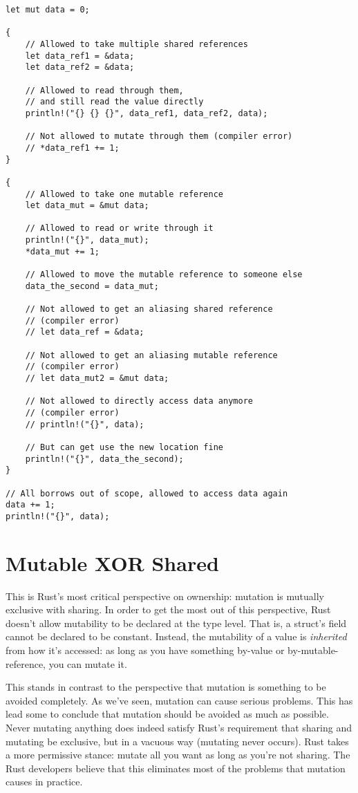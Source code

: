 \begin{verbatim}
let mut data = 0;

{
    // Allowed to take multiple shared references
    let data_ref1 = &data;
    let data_ref2 = &data;

    // Allowed to read through them,
    // and still read the value directly
    println!("{} {} {}", data_ref1, data_ref2, data);

    // Not allowed to mutate through them (compiler error)
    // *data_ref1 += 1;
}

{
    // Allowed to take one mutable reference
    let data_mut = &mut data;

    // Allowed to read or write through it
    println!("{}", data_mut);
    *data_mut += 1;

    // Allowed to move the mutable reference to someone else
    data_the_second = data_mut;

    // Not allowed to get an aliasing shared reference
    // (compiler error)
    // let data_ref = &data;

    // Not allowed to get an aliasing mutable reference
    // (compiler error)
    // let data_mut2 = &mut data;

    // Not allowed to directly access data anymore
    // (compiler error)
    // println!("{}", data);

    // But can get use the new location fine
    println!("{}", data_the_second);
}

// All borrows out of scope, allowed to access data again
data += 1;
println!("{}", data);
\end{verbatim}



\section{Mutable XOR Shared}

This is Rust's most critical perspective on ownership: mutation is mutually
exclusive with sharing. In order to get the most out of this perspective, Rust
doesn't allow mutability to be declared at the type level. That is, a struct's
field cannot be declared to be constant. Instead, the mutability of a value is
\emph{inherited} from how it's accessed: as long as you have something by-value or
by-mutable-reference, you can mutate it.

This stands in contrast to the perspective that mutation is something to be
avoided completely. As we've seen, mutation can cause serious problems. This
has lead some to conclude that mutation should be avoided as much
as possible. Never mutating anything does indeed satisfy Rust's requirement
that sharing and mutating be exclusive, but in a vacuous way (mutating never
occurs). Rust takes a more permissive stance: mutate all you want as long
as you're not sharing. The Rust developers believe that this eliminates
most of the problems that mutation causes in practice.

